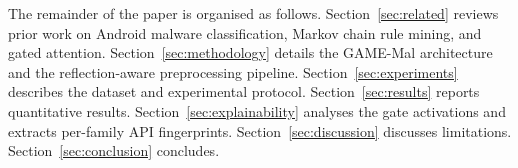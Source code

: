 The remainder of the paper is organised as follows.
Section~\ref{sec:related} reviews prior work on Android malware
classification, Markov chain rule mining, and gated attention.
Section~\ref{sec:methodology} details the GAME-Mal architecture and
the reflection-aware preprocessing pipeline.
Section~\ref{sec:experiments} describes the dataset and experimental
protocol. Section~\ref{sec:results} reports quantitative results.
Section~\ref{sec:explainability} analyses the gate activations and
extracts per-family API fingerprints.
Section~\ref{sec:discussion} discusses limitations.
Section~\ref{sec:conclusion} concludes.
